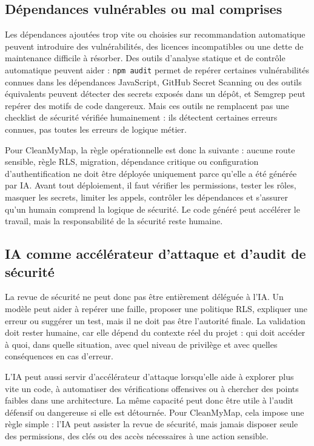\documentclass[
  10pt,
  a4paper,
  DIV=11,
  numbers=noendperiod,
  oneside]{scrreprt}
\begin{document}
\subsection{Dépendances vulnérables ou mal
comprises}\label{duxe9pendances-vulnuxe9rables-ou-mal-comprises}

Les dépendances ajoutées trop vite ou choisies sur recommandation
automatique peuvent introduire des vulnérabilités, des licences
incompatibles ou une dette de maintenance difficile à résorber. Des
outils d'analyse statique et de contrôle automatique peuvent aider :
\texttt{npm\ audit} permet de repérer certaines vulnérabilités connues
dans les dépendances JavaScript, GitHub Secret Scanning ou des outils
équivalents peuvent détecter des secrets exposés dans un dépôt, et
Semgrep peut repérer des motifs de code dangereux. Mais ces outils ne
remplacent pas une checklist de sécurité vérifiée humainement : ils
détectent certaines erreurs connues, pas toutes les erreurs de logique
métier.

Pour CleanMyMap, la règle opérationnelle est donc la suivante : aucune
route sensible, règle RLS, migration, dépendance critique ou
configuration d'authentification ne doit être déployée uniquement parce
qu'elle a été générée par IA. Avant tout déploiement, il faut vérifier
les permissions, tester les rôles, masquer les secrets, limiter les
appels, contrôler les dépendances et s'assurer qu'un humain comprend la
logique de sécurité. Le code généré peut accélérer le travail, mais la
responsabilité de la sécurité reste humaine.

\subsection{IA comme accélérateur d'attaque et d'audit de
sécurité}\label{ia-comme-accuxe9luxe9rateur-dattaque-et-daudit-de-suxe9curituxe9}

La revue de sécurité ne peut donc pas être entièrement déléguée à l'IA.
Un modèle peut aider à repérer une faille, proposer une politique RLS,
expliquer une erreur ou suggérer un test, mais il ne doit pas être
l'autorité finale. La validation doit rester humaine, car elle dépend du
contexte réel du projet : qui doit accéder à quoi, dans quelle
situation, avec quel niveau de privilège et avec quelles conséquences en
cas d'erreur.

L'IA peut aussi servir d'accélérateur d'attaque lorsqu'elle aide à
explorer plus vite un code, à automatiser des vérifications offensives
ou à chercher des points faibles dans une architecture. La même capacité
peut donc être utile à l'audit défensif ou dangereuse si elle est
détournée. Pour CleanMyMap, cela impose une règle simple : l'IA peut
assister la revue de sécurité, mais jamais disposer seule des
permissions, des clés ou des accès nécessaires à une action sensible.
\end{document}
